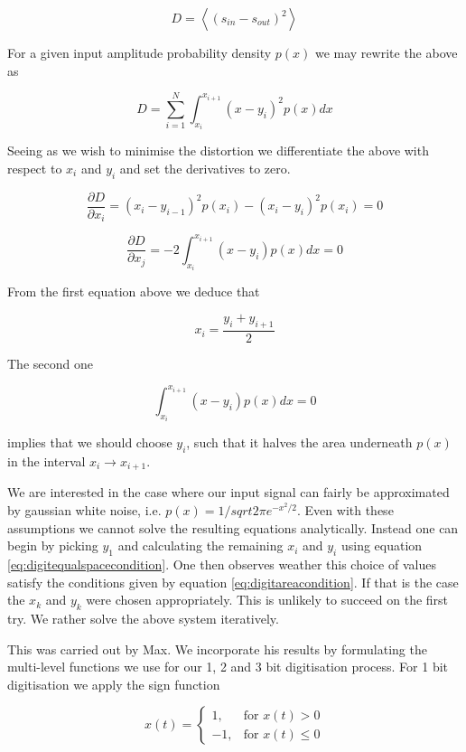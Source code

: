 \documentclass[apj]{emulateapj}
\begin{document}
\[ D = \left\langle  \left( s_{in} - s_{out} \right)^2 \right\rangle \]

For a given input amplitude probability density $p(x)$ we may rewrite the above as

\[ D = \sum_{i = 1}^N \int_{x_i}^{x_{i+1}} \left(x-y_i\right)^2 p(x) dx \]

Seeing as we wish to minimise the distortion we differentiate the above with respect to $x_i$ and $y_i$ and set the derivatives to zero.

\[ \frac{\partial D}{\partial x_i} = \left(x_i-y_{i-1}\right)^2 p(x_i) - \left(x_i - y_i\right)^2 p(x_i) = 0 \]

\[ \frac{\partial D}{\partial x_j} = -2 \int_{x_i}^{x_{i+1}} \left( x-y_i \right) p(x) dx = 0 \]

From the first equation above we deduce that

\begin{equation} \label{eq:digitequalspacecondition}
x_i = \frac{y_i+y_{i+1}}{2}
\end{equation}

The second one

\begin{equation} \label{eq:digitareacondition}
\int_{x_i}^{x_{i+1}} \left( x-y_i \right) p(x) dx = 0
\end{equation}

implies that we should choose $y_i$, such that it halves the area underneath $p(x)$ in the interval $x_i \to x_{i+1}$.

We are interested in the case where our input signal can fairly be approximated by gaussian white noise, i.e. $p(x) = 1/sqrt{2\pi} e^{-x^2/2}$. Even with these assumptions we cannot solve the resulting equations analytically. Instead one can begin by picking $y_1$ and calculating the remaining $x_i$ and $y_i$ using equation \ref{eq:digitequalspacecondition}. One then observes weather this choice of values satisfy the conditions given by equation \ref{eq:digitareacondition}. If that is the case the $x_k$ and $y_k$ were chosen appropriately. This is unlikely to succeed on the first try. We rather solve the above system iteratively.

This was carried out by Max. We incorporate his results by formulating the multi-level functions we use for our 1, 2 and 3 bit digitisation process. For 1 bit digitisation we apply the sign function

\[ \hat{x}(t) = \left\{ \begin{array}{lr}
1, & \text{for } x(t) > 0\\
-1, & \text{for } x(t) \leq 0
\end{array} \right. \]
\end{document}
